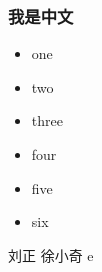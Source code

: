 \documentclass[slidestop,compress,mathserif]{beamer}
\begin{document}
\begin{frame}
\frametitle{我是中文} 
\begin{itemize}[<+->]
\item one
\item two
\item three
\item four
\item five
\item six
\end{itemize}

刘正 徐小奇 e
\end{frame}
\end{document}
